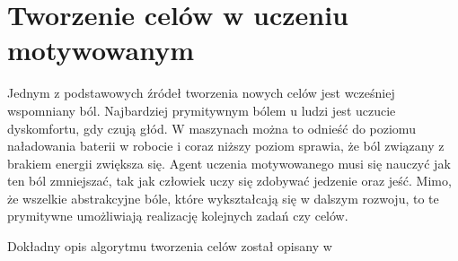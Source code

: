 \section{Tworzenie celów w uczeniu motywowanym}

Jednym z podstawowych źródeł tworzenia nowych celów jest wcześniej wspomniany 
ból. Najbardziej prymitywnym bólem u ludzi jest uczucie dyskomfortu, gdy czują 
głód. W maszynach można to odnieść do poziomu naładowania baterii w robocie i 
coraz niższy poziom sprawia, że ból związany z brakiem energii zwiększa się. 
Agent uczenia motywowanego musi się nauczyć jak ten ból zmniejszać, tak jak 
człowiek uczy się zdobywać jedzenie oraz jeść. Mimo, że wszelkie abstrakcyjne 
bóle, które wykształcają się w dalszym rozwoju, to te prymitywne umożliwiają 
realizację kolejnych zadań czy celów.

Dokładny opis algorytmu tworzenia celów został opisany w 
\cite{ml_comp_int}

